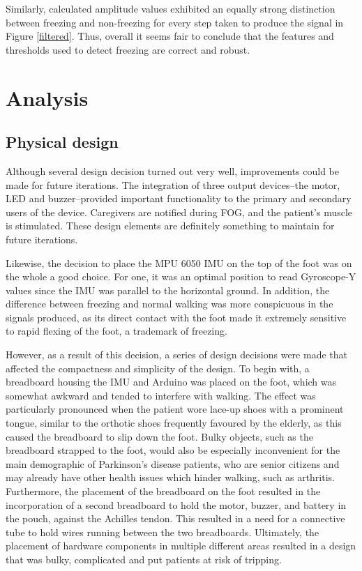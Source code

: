 \documentclass[titlepage]{article}
\begin{document}
\begin{doublespacing}
Similarly, calculated amplitude values exhibited an equally strong distinction between freezing and non-freezing for every step taken to produce the signal in Figure \ref{filtered}. Thus, overall it seems fair to conclude that the features and thresholds used to detect freezing are correct and robust.

\clearpage
\section{Analysis}
\subsection{Physical design}
Although several design decision turned out very well, improvements could be made for future iterations. The integration of three output devices--the motor, LED and buzzer--provided important functionality to the primary and secondary users of the device. Caregivers are notified during FOG, and the patient's muscle is stimulated. These design elements are definitely something to maintain for future iterations.

Likewise, the decision to place the MPU 6050 IMU on the top of the foot was on the whole a good choice. For one, it was an optimal position to read Gyroscope-Y values since the IMU was parallel to the horizontal ground. In addition, the difference between freezing and normal walking was more conspicuous in the signals produced, as its direct contact with the foot made it extremely sensitive to rapid flexing of the foot, a trademark of freezing. 

However, as a result of this decision, a series of design decisions were made that affected the compactness and simplicity of the design. To begin with, a breadboard housing the IMU and Arduino was placed on the foot, which was somewhat awkward and tended to interfere with walking. The effect was particularly pronounced when the patient wore lace-up shoes with a prominent tongue, similar to the orthotic shoes frequently favoured by the elderly, as this caused the breadboard to slip down the foot. Bulky objects, such as the breadboard strapped to the foot, would also be especially inconvenient for the main demographic of Parkinson's disease patients, who are senior citizens and may already have other health issues which hinder walking, such as arthritis. Furthermore, the placement of the breadboard on the foot resulted in the incorporation of a second breadboard to hold the motor, buzzer, and battery in the pouch, against the Achilles tendon. This resulted in a need for a connective tube to hold wires running between the two breadboards. Ultimately, the placement of hardware components in multiple different areas resulted in a design that was bulky, complicated and put patients at risk of tripping.


\end{doublespacing}
\end{document}
